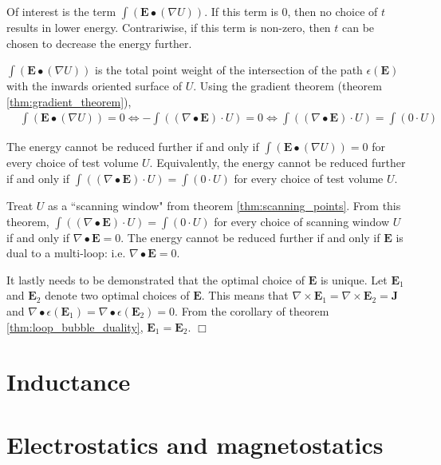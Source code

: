 Of interest is the term \(\int (\mathbf{E} \bullet (\nabla U))\). If this term is \(0\), then no choice of \(t\) results in lower energy. Contrariwise, if this term is non-zero, then \(t\) can be chosen to decrease the energy further. 

\(\int (\mathbf{E} \bullet (\nabla U))\) is the total point weight of the intersection of the path \(\epsilon(\mathbf{E})\) with the inwards oriented surface of \(U\). Using the gradient theorem (theorem \ref{thm:gradient_theorem}), 
\begin{align*}
& \int (\mathbf{E} \bullet (\nabla U)) = 0
\iff -\int ((\nabla \bullet \mathbf{E}) \cdot U) = 0 
\iff \int ((\nabla \bullet \mathbf{E}) \cdot U) = \int (0 \cdot U) 
\end{align*}

The energy cannot be reduced further if and only if \(\int (\mathbf{E} \bullet (\nabla U)) = 0\) for every choice of test volume \(U\). Equivalently, the energy cannot be reduced further if and only if \(\int ((\nabla \bullet \mathbf{E}) \cdot U) = \int (0 \cdot U)\) for every choice of test volume \(U\).

Treat \(U\) as a ``scanning window" from theorem \ref{thm:scanning_points}. From this theorem, \(\int ((\nabla \bullet \mathbf{E}) \cdot U) = \int (0 \cdot U)\) for every choice of scanning window \(U\) if and only if \(\nabla \bullet \mathbf{E} = 0\). The energy cannot be reduced further if and only if \(\mathbf{E}\) is dual to a multi-loop: i.e. \(\nabla \bullet \mathbf{E} = 0\).

It lastly needs to be demonstrated that the optimal choice of \(\mathbf{E}\) is unique. Let \(\mathbf{E}_1\) and \(\mathbf{E}_2\) denote two optimal choices of \(\mathbf{E}\). This means that \(\nabla \times \mathbf{E}_1 = \nabla \times \mathbf{E}_2 = \mathbf{J}\) and \(\nabla \bullet \epsilon(\mathbf{E}_1) = \nabla \bullet \epsilon(\mathbf{E}_2) = 0\). From the corollary of theorem \ref{thm:loop_bubble_duality}, \(\mathbf{E}_1 = \mathbf{E}_2\). \(\Box\) 



\section{Inductance}



\section{Electrostatics and magnetostatics}








